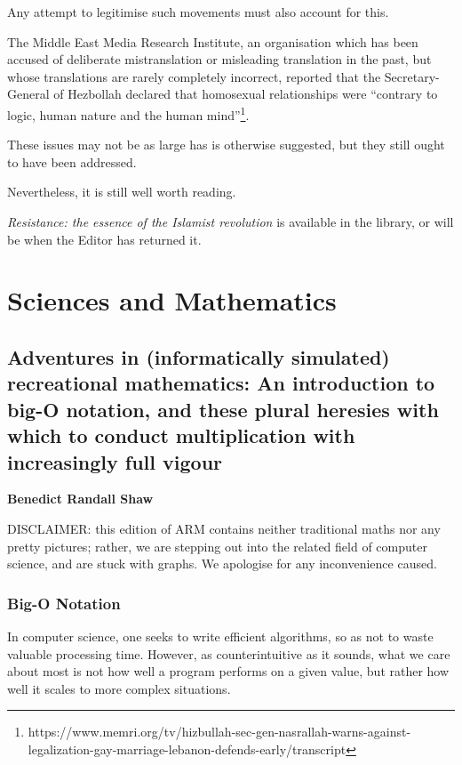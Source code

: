 \documentclass[12pt,a4paper]{report}
\newcounter{count}
\begin{document}
\begin{multicols}{2}
Any attempt to legitimise such movements must also account for this.

The Middle East Media Research Institute, an organisation which has been
accused of deliberate mistranslation or misleading translation in the
past, but whose translations are rarely completely incorrect, reported
that the Secretary-General of Hezbollah declared that homosexual
relationships were ``contrary to logic, human nature and the human
mind''\footnote{https://www.memri.org/tv/hizbullah-sec-gen-nasrallah-warns-against-legalization-gay-marriage-lebanon-defends-early/transcript}.

These issues may not be as large has is otherwise suggested, but they
still ought to have been addressed.

Nevertheless, it is still well worth reading.

\textit{Resistance: the essence of the Islamist revolution} is available
in the library, or will be when the Editor has returned it.

\end{multicols}

\chapter{Sciences and Mathematics}

\section{Adventures in (informatically simulated) recreational mathematics: An introduction to big-O notation, and these plural heresies with which to conduct multiplication with increasingly full vigour}

\textbf{Benedict Randall Shaw}

\begin{multicols}{2}

DISCLAIMER: this edition of ARM contains neither traditional maths nor any pretty pictures; rather, we are stepping out into the related field of computer science, and are stuck with graphs. We apologise for any inconvenience caused.

\subsection{Big-O Notation}

In computer science, one seeks to write efficient algorithms, so as not to waste valuable processing time. However, as counterintuitive as it sounds, what we care about most is not how well a program performs on a given value, but rather how well it scales to more complex situations.\\

\end{multicols}
\end{document}
